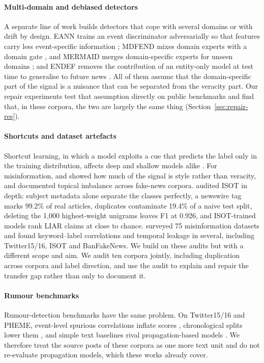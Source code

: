 \paragraph{Multi-domain and debiased detectors}
A separate line of work builds detectors that cope with several domains or with drift by design. EANN trains an event discriminator adversarially so that features carry less event-specific information \citep{wang2018eann}; MDFEND mixes domain experts with a domain gate \citep{nan2021mdfend}, and MERMAID merges domain-specific experts for unseen domains \citep{liguori2025mermaid}; and ENDEF removes the contribution of an entity-only model at test time to generalise to future news \citep{zhu2022endef}. All of them assume that the domain-specific part of the signal is a nuisance that can be separated from the veracity part. Our repair experiments test that assumption directly on public benchmarks and find that, in these corpora, the two are largely the same thing (Section~\ref{sec:repair-res}).

\paragraph{Shortcuts and dataset artefacts}
Shortcut learning, in which a model exploits a cue that predicts the label only in the training distribution, affects deep and shallow models alike \citep{geirhos2020shortcut,gururangan2018artifacts,mccoy2019right}. For misinformation, \citet{horne2017thisjustin} and \citet{schuster2020stylometry} showed how much of the signal is style rather than veracity, and \citet{asr2019bigdata} documented topical imbalance across fake-news corpora. \citet{verma2026audit} audited ISOT in depth: subject metadata alone separate the classes perfectly, a newswire tag marks 99.2\% of real articles, duplicates contaminate 19.4\% of a naive test split, deleting the 1{,}000 highest-weight unigrams leaves F1 at 0.926, and ISOT-trained models rank LIAR claims at close to chance. \citet{thibault2025guide} surveyed 75 misinformation datasets and found keyword--label correlations and temporal leakage in several, including Twitter15/16, ISOT and BanFakeNews. We build on these audits but with a different scope and aim. We audit ten corpora jointly, including duplication across corpora and label direction, and use the audit to explain and repair the transfer gap rather than only to document it.

\paragraph{Rumour benchmarks}
Rumour-detection benchmarks have the same problem. On Twitter15/16 and PHEME, event-level spurious correlations inflate scores \citep{wu2022spurious}, chronological splits lower them \citep{mu2023time}, and simple text baselines rival propagation-based models \citep{pelrine2021simple}. We therefore treat the source posts of these corpora as one more text unit and do not re-evaluate propagation models, which these works already cover.

